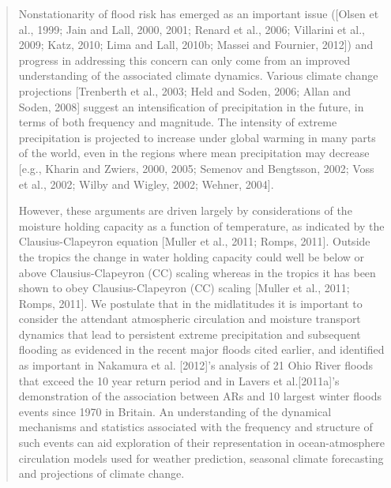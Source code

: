 \documentclass[11pt]{article}
\begin{document}
\begin{quotation}
	Nonstationarity of flood risk has emerged as an important issue ([Olsen et al., 1999; Jain and Lall, 2000, 2001; Renard et al., 2006; Villarini et al., 2009; Katz, 2010; Lima and Lall, 2010b; Massei and Fournier, 2012]) and progress in addressing this concern can only come from an improved understanding of the associated climate dynamics.
	Various climate change projections [Trenberth et al., 2003; Held and Soden, 2006; Allan and Soden, 2008] suggest an intensification of precipitation in the future, in terms of both frequency and magnitude.
	The intensity of extreme precipitation is projected to increase under global warming in many parts of the world, even in the regions where mean precipitation may decrease [e.g., Kharin and Zwiers, 2000, 2005; Semenov and Bengtsson, 2002; Voss et al., 2002; Wilby and Wigley, 2002; Wehner, 2004].

	However, these arguments are driven largely by considerations of the moisture holding capacity as a function of temperature, as indicated by the Clausius-Clapeyron equation [Muller et al., 2011; Romps, 2011].
	Outside the tropics the change in water holding capacity could well be below or above Clausius-Clapeyron (CC) scaling whereas in the tropics it has been shown to obey Clausius-Clapeyron (CC) scaling [Muller et al., 2011; Romps, 2011].
	We postulate that in the midlatitudes it is important to consider the attendant atmospheric circulation and moisture transport dynamics that lead to persistent extreme precipitation and subsequent flooding as evidenced in the recent major floods cited earlier, and identified as important in Nakamura et al. [2012]’s analysis of 21 Ohio River floods that exceed the 10 year return period and in Lavers et al.[2011a]’s demonstration of the association between ARs and 10 largest winter floods events since 1970 in Britain.
	An understanding of the dynamical mechanisms and statistics associated with the frequency and structure of such events can aid exploration of their representation in ocean-atmosphere circulation models used for weather prediction, seasonal climate forecasting and projections of climate change.


\end{quotation}
\end{document}
